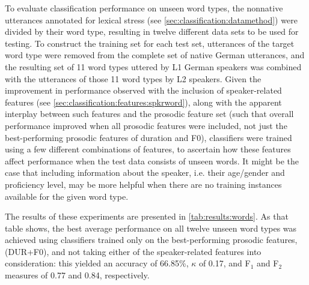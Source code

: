 	
	To evaluate classification performance on unseen word types, the nonnative utterances annotated for lexical stress (see \cref{sec:classification:datamethod}) were divided by their word type, resulting in twelve different data sets to be used for testing. To construct the training set for each test set, utterances of the target word type  were removed from the complete set of native German utterances, and the resulting set of 11 word types uttered by L1 German speakers was combined with the utterances of those 11 word types by L2 speakers. Given the improvement in performance observed with the inclusion of speaker-related features (see \cref{sec:classification:features:spkrword}), along with the apparent interplay between such features and the prosodic feature set (such that overall performance improved when all prosodic features were included, not just the best-performing prosodic features of duration and F0), classifiers were trained using a few  different combinations of features, to ascertain how these features affect performance when the test data consists of unseen words. It might be the case that including information about the speaker, i.e. their age/gender and proficiency level, may be more helpful when there are no training instances available for the given word type. 
	
	The results of these experiments are presented in \cref{tab:results:words}. As that table shows, the best average performance on all twelve unseen word types was achieved using classifiers trained only on the best-performing prosodic features,(DUR+F0), and not taking either of the speaker-related features into consideration: this yielded an accuracy of 66.85\%, $\kappa$ of 0.17, and F$_1$ and F$_2$ measures of 0.77 and 0.84, respectively. 
	

